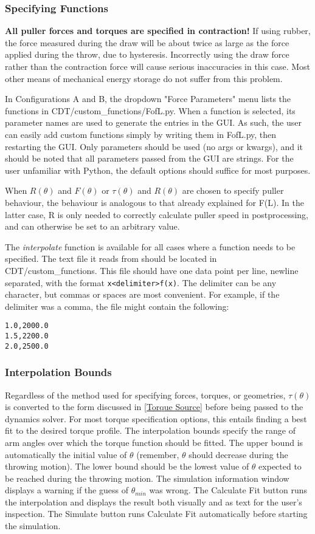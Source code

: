 \documentclass{article}
\begin{document}
\subsubsection{Specifying Functions}
\textbf{All puller forces and torques are specified in contraction!} If using rubber, the force measured during the draw will be about twice as large as the force applied during the throw, due to hysteresis. Incorrectly using the draw force rather than the contraction force will cause serious inaccuracies in this case. Most other means of mechanical energy storage do not suffer from this problem.\par
In Configurations A and B, the dropdown "Force Parameters" menu lists the functions in CDT/custom\_functions/FofL.py. When a function is selected, its parameter names are used to generate the entries in the GUI. As such, the user can easily add custom functions simply by writing them in FofL.py, then restarting the GUI. Only parameters should be used (no args or kwargs), and it should be noted that all parameters passed from the GUI are strings. For the user unfamiliar with Python, the default options should suffice for most purposes.\par
When $R(\theta)$ and $F(\theta)$ or $\tau(\theta)$ and $R(\theta)$ are chosen to specify puller behaviour, the behaviour is analogous to that already explained for F(L). In the latter case, R is only needed to correctly calculate puller speed in postprocessing, and can otherwise be set to an arbitrary value.\par
The \emph{interpolate} function is available for all cases where a function needs to be specified. The text file it reads from should be located in CDT/custom\_functions. This file should have one data point per line, newline separated, with the format \verb|x<delimiter>f(x)|. The delimiter can be any character, but commas or spaces are most convenient. For example, if the delimiter was a comma, the file might contain the following:
\begin{lstlisting}
1.0,2000.0
1.5,2200.0
2.0,2500.0
\end{lstlisting}

\subsubsection{Interpolation Bounds}
Regardless of the method used for specifying forces, torques, or geometries, $\tau(\theta)$ is converted to the form discussed in \ref{Torque Source} before being passed to the dynamics solver. For most torque specification options, this entails finding a best fit to the desired torque profile. The interpolation bounds specify the range of arm angles over which the torque function should be fitted. The upper bound is automatically the initial value of $\theta$ (remember, $\theta$ should decrease during the throwing motion). The lower bound should be the lowest value of $\theta$ expected to be reached during the throwing motion. The simulation information window displays a warning if the guess of $\theta_{min}$ was wrong. The Calculate Fit button runs the interpolation and displays the result both visually and as text for the user's inspection. The Simulate button runs Calculate Fit automatically before starting the simulation.
\end{document}
